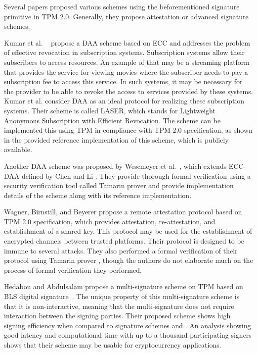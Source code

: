 Several papers proposed various schemes using the beforementioned signature primitive in TPM 2.0. Generally, they propose attestation or advanced signature schemes.

Kumar et al. ~\cite{kumar2018direct} propose a DAA scheme based on ECC and addresses the problem of effective revocation in subscription systems. Subscription systems allow their subscribers to access resources. An example of that may be a streaming platform that provides the service for viewing movies where the subscriber needs to pay a subscription fee to access this service. In such systems, it may be necessary for the provider to be able to revoke the access to services provided by these systems. Kumar et al. consider DAA as an ideal protocol for realizing these subscription systems. Their scheme is called LASER, which stands for Lightweight Anonymous Subscription with Efficient Revocation. The scheme can be implemented this using TPM in compliance with TPM 2.0 specification, as shown in the provided reference implementation of this scheme, which is publicly available. 

Another DAA scheme was proposed by Wesemeyer et al.~\cite{wesemeyerDAA}, which extends ECC-DAA defined by Chen and Li \cite{chen2013flexible}. They provide thorough formal verification using a security verification tool called Tamarin prover \cite{meier2013tamarin} and provide implementation details of the scheme along with its reference implementation.

Wagner, Birnstill, and Beyerer \cite{wagnerRemoteAttProtocol} propose a remote attestation protocol based on TPM 2.0 specification, which provides attestation, re-attestation, and establishment of a shared key. This protocol may be used for the establishment of encrypted channels between trusted platforms. Their protocol is designed to be immune to several attacks. They also performed a formal verification of their protocol using Tamarin prover \cite{meier2013tamarin}, though the authors do not elaborate much on the process of formal verification they performed.

Hedabou and Abdulsalam \cite{hedabou2020efficient} propose a multi-signature scheme on TPM based on BLS digital signature~\cite{blsSignatures}. The unique property of this multi-signature scheme is that it is non-interactive, meaning that the multi-signature does not require interaction between the signing parties. Their proposed scheme shows high signing efficiency when compared to signature schemes \cite{chen2013flexible} and \cite{schnorrSpec}. An analysis showing good latency and computational time with up to a thousand participating signers shows that their scheme may be usable for cryptocurrency applications.

